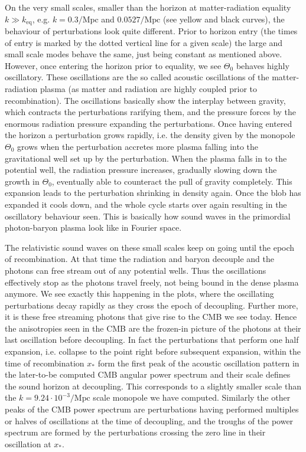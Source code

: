 \documentclass[twocolumn]{aastex62}
\begin{document}
On the very small scales, smaller than the horizon at matter-radiation equality $k \gg k_\text{eq}$, e.g. $k = 0.3 /\mathrm{Mpc}$ and $0.0527 /\mathrm{Mpc}$ (see yellow and black curves), the behaviour of perturbations look quite different. Prior to horizon entry (the times of entry is marked by the dotted vertical line for a given scale) the large and small scale modes behave the same, just being constant as mentioned above. However, once entering the horizon prior to equality, we see $\Theta_0$ behaves highly oscillatory. These oscillations are the so called acoustic oscillations of the matter-radiation plasma (as matter and radiation are highly coupled prior to recombination). The oscillations basically show the interplay between gravity, which contracts the perturbations rarifying them, and the pressure forces by the enormous radiation pressure expanding the perturbations. Once having entered the horizon a perturbation grows rapidly, i.e. the density given by the monopole $\Theta_0$ grows when the perturbation accretes more plasma falling into the gravitational well set up by the perturbation. When the plasma falls in to the potential well, the radiation pressure increases, gradually slowing down the growth in $\Theta_0$, eventually able to counteract the pull of gravity completely. This expansion leads to the perturbation shrinking in density again. Once the blob has expanded it cools down, and the whole cycle starts over again resulting in the oscillatory behaviour seen. This is basically how sound waves in the primordial photon-baryon plasma look like in Fourier space.

The relativistic sound waves on these small scales keep on going until the epoch of recombination. At that time the radiation and baryon decouple and the photons can free stream out of any potential wells. Thus the oscillations effectively stop as the photons travel freely, not being bound in the dense plasma anymore. We see exactly this happening in the plots, where the oscillating perturbations decay rapidly as they cross the epoch of decoupling. Further more, it is these free streaming photons that give rise to the CMB we see today. Hence the anisotropies seen in the CMB are the frozen-in picture of the photons at their last oscillation before decoupling. In fact the perturbations that perform one half expansion, i.e. collapse to the point right before subsequent expansion, within the time of recombination $x_*$ form the first peak of the acoustic oscillation pattern in the later-to-be computed CMB angular power spectrum and their scale defines the sound horizon at decoupling. This corresponds to a slightly smaller scale than the $k = 9.24\cdot 10^{-3}/\mathrm{Mpc}$ scale monopole we have computed. Similarly the other peaks of the CMB power spectrum are perturbations having performed multiples or halves of oscillations at the time of decoupling, and the troughs of the power spectrum are formed by the perturbations crossing the zero line in their oscillation at $x_*$.
\end{document}

